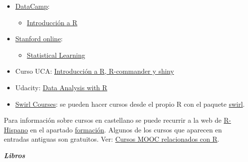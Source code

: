 \documentclass[
]{book}
\providecommand{\tightlist}{%
  \setlength{\itemsep}{0pt}\setlength{\parskip}{0pt}}
\theoremstyle{break}
\theoremstyle{nonumberplain}
\begin{document}
\begin{itemize}
\item
  \href{https://www.datacamp.com/courses}{DataCamp}:

  \begin{itemize}
  \tightlist
  \item
    \href{https://www.datacamp.com/courses/introduccion-a-r/}{Introducción a R}
  \end{itemize}
\end{itemize}

\begin{itemize}
\item
  \href{http://online.stanford.edu/courses}{Stanford online}:

  \begin{itemize}
  \tightlist
  \item
    \href{http://online.stanford.edu/course/statistical-learning}{Statistical Learning}
  \end{itemize}
\end{itemize}

\begin{itemize}
\tightlist
\item
  Curso UCA: \href{http://knuth.uca.es/moodle/course/view.php?id=51}{Introducción a R, R-commander y shiny}
\end{itemize}

\begin{itemize}
\tightlist
\item
  Udacity: \href{https://eu.udacity.com/course/data-analysis-with-r--ud651}{Data Analysis with R}
\end{itemize}

\begin{itemize}
\tightlist
\item
  \href{https://swirlstats.com/scn/title.html}{Swirl Courses}:
  se pueden hacer cursos desde el propio R con el paquete
  \href{https://swirlstats.com}{swirl}.
\end{itemize}

Para información sobre cursos en castellano se puede recurrir a la web de \href{http://r-es.org/}{R-Hispano} en el apartado \href{http://r-es.org/category/formacion}{formación}. Algunos de los cursos que aparecen en entradas antiguas son gratuitos.
Ver: \href{http://r-es.org/2016/02/12/cursos-masivos-y-otra-formacion-on-line-sobre-r/}{Cursos MOOC relacionados con R}.

\textbf{\emph{Libros}}
\end{document}
